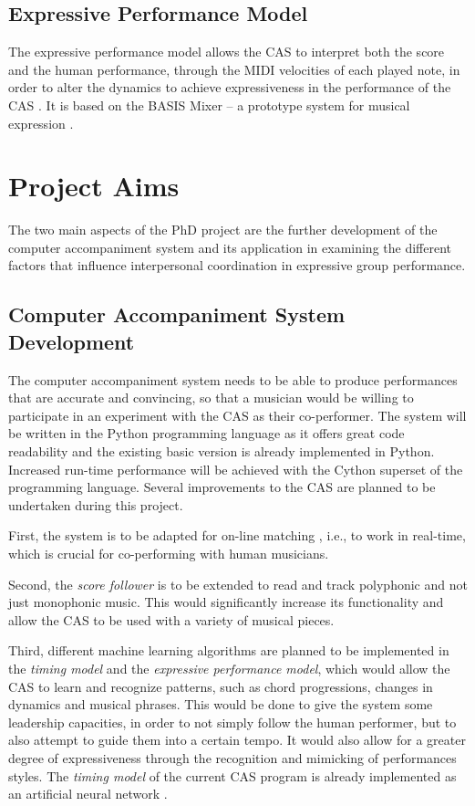 \documentclass[12pt]{scrartcl}
\begin{document}
\subsection{Expressive Performance Model}
\label{expressive-performance-model}
The expressive performance model allows the CAS to interpret both the score and the human performance, through the MIDI velocities of each played note, in order to alter the dynamics to achieve expressiveness in the performance of the CAS \citep{de-poli}. It is based on the BASIS Mixer -- a prototype system for musical expression \citep{basis-dynamics, basis}.



\section{Project Aims}
\label{project-aims}
The two main aspects of the PhD project are the further development of the computer accompaniment system and its application in examining the different factors that influence interpersonal coordination in expressive group performance.

\subsection{Computer Accompaniment System Development}
\label{cas-development}
The computer accompaniment system needs to be able to produce performances that are accurate and convincing, so that a musician would be willing to participate in an experiment with the CAS as their co-performer. The system will be written in the Python programming language as it offers great code readability and the existing basic version is already implemented in Python. Increased run-time performance will be achieved with the Cython superset of the programming language. Several improvements to the CAS are planned to be undertaken during this project. 

First, the system is to be adapted for on-line matching \citep{music-score-alignment}, i.e., to work in real-time, which is crucial for co-performing with human musicians. 

Second, the \textit{score follower} is to be extended to read and track polyphonic and not just monophonic music. This would significantly increase its functionality and allow the CAS to be used with a variety of musical pieces. 

Third, different machine learning algorithms are planned to be implemented in the \textit{timing model} and the \textit{expressive performance model}, which would allow the CAS to learn and recognize patterns, such as chord progressions, changes in dynamics and musical phrases. This would be done to give the system some leadership capacities, in order to not simply follow the human performer, but to also attempt to guide them into a certain tempo. It would also allow for a greater degree of expressiveness through the recognition and mimicking of performances styles. The \textit{timing model} of the current CAS program is already implemented as an artificial neural network \citep{bishop2}.  
\end{document}
